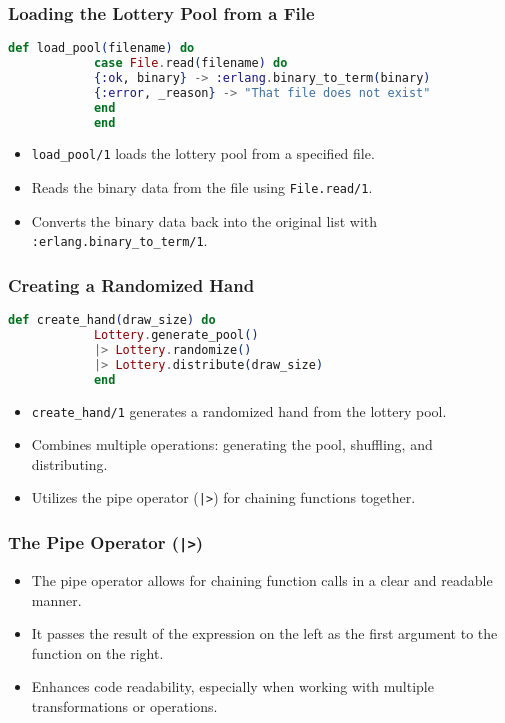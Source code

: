 \documentclass[aspectratio=169, table]{beamer}
\begin{document}
	\begin{frame}[fragile]
		\frametitle{Loading the Lottery Pool from a File}
		\begin{lstlisting}[language=Elixir]
			def load_pool(filename) do
			case File.read(filename) do
			{:ok, binary} -> :erlang.binary_to_term(binary)
			{:error, _reason} -> "That file does not exist"
			end
			end
		\end{lstlisting}
		\begin{itemize}
			\item \texttt{load\_pool/1} loads the lottery pool from a specified file.
			\item Reads the binary data from the file using \texttt{File.read/1}.
			\item Converts the binary data back into the original list with \texttt{:erlang.binary\_to\_term/1}.
		\end{itemize}
	\end{frame}
	
	\begin{frame}[fragile]
		\frametitle{Creating a Randomized Hand}
		\begin{lstlisting}[language=Elixir]
			def create_hand(draw_size) do
			Lottery.generate_pool()
			|> Lottery.randomize()
			|> Lottery.distribute(draw_size)
			end
		\end{lstlisting}
		\begin{itemize}
			\item \texttt{create\_hand/1} generates a randomized hand from the lottery pool.
			\item Combines multiple operations: generating the pool, shuffling, and distributing.
			\item Utilizes the pipe operator (\texttt{|>}) for chaining functions together.
		\end{itemize}
	\end{frame}
	
	\begin{frame}
		\frametitle{The Pipe Operator (\texttt{|>})}
		\begin{itemize}
			\item The pipe operator allows for chaining function calls in a clear and readable manner.
			\item It passes the result of the expression on the left as the first argument to the function on the right.
			\item Enhances code readability, especially when working with multiple transformations or operations.
		\end{itemize}
	\end{frame}
	
\end{document}
